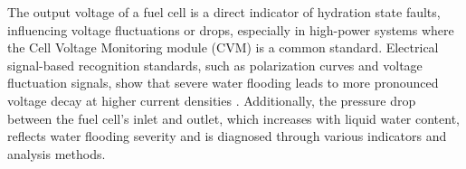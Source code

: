 
\par

The output voltage of a fuel cell is a direct indicator of hydration state faults, influencing voltage fluctuations or drops, especially in high-power systems where the Cell Voltage Monitoring module (CVM) is a common standard\cite{liReviewWaterFlooding2008,legrosFirstResultsPEMFC2011}. Electrical signal-based recognition standards, such as polarization curves and voltage fluctuation signals, show that severe water flooding leads to more pronounced voltage decay at higher current densities \cite{wuDiagnosticToolsPEM2008}. Additionally, the pressure drop between the fuel cell's inlet and outlet, which increases with liquid water content, reflects water flooding severity and is diagnosed through various indicators and analysis methods\cite{liNovelApproachDetermine2017}.


